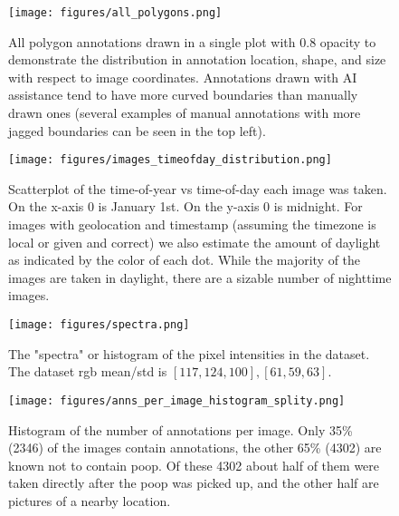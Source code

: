 \documentclass[10pt,twocolumn,letterpaper]{article}
\begin{document}

\begin{figure}[h]
\centering
\texttt{[image: figures/all\_polygons.png]}
\caption[]{
    All polygon annotations drawn in a single plot with 0.8 opacity to
    demonstrate the distribution in annotation location, shape, and size with
    respect to image coordinates. Annotations drawn with AI
    assistance tend to have more curved boundaries than manually drawn ones
    (several examples of manual annotations with more jagged boundaries can be
    seen in the top left).
}
\label{fig:AllPolygons}
\end{figure}

\begin{figure}[h]
\centering
\texttt{[image: figures/images\_timeofday\_distribution.png]}
\caption[]{
    Scatterplot of the time-of-year vs time-of-day each image was taken. On the
    x-axis 0 is January 1st. On the y-axis 0 is midnight. For images with
    geolocation and timestamp (assuming the timezone is local or given and
    correct) we also estimate the amount of daylight as indicated by the color
    of each dot. While the majority of the images are taken in daylight, there
    are a sizable number of nighttime images.
}
\label{fig:TimeOfDayDistribution}
\end{figure}

\begin{figure}[h]
\centering
\texttt{[image: figures/spectra.png]}
\caption[]{
    The "spectra" or histogram of the pixel intensities in the dataset. 
    The dataset rgb  mean/std is $[117, 124, 100], [61, 59, 63]$.
}
\label{fig:spectra}
\end{figure}


\begin{figure}[h]
\centering
\texttt{[image: figures/anns\_per\_image\_histogram\_splity.png]}
\caption[]{
    Histogram of the number of annotations per image. 
    Only 35\% (2346) of the images contain annotations, the other 65\% (4302)
    are known not to contain poop. Of these 4302 about half of them were taken
    directly after the poop was picked up, and the other half are pictures of a
    nearby location.
}
\label{fig:AnnotsPerImage}
\end{figure}
\end{document}
